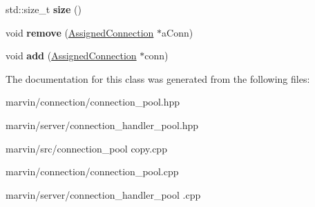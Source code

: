 \begin{DoxyCompactItemize}
\mbox{\label{class_in_use_connections_type_a0dc7ed043e59287fac24b3828dcd5ec6}} 
std\+::size\+\_\+t {\bfseries size} ()
\item 
\mbox{\label{class_in_use_connections_type_a3a12406ec1666fe7d0c53391b2cba2b3}} 
void {\bfseries remove} (\hyperlink{class_assigned_connection}{Assigned\+Connection} $\ast$a\+Conn)
\item 
\mbox{\label{class_in_use_connections_type_a36211f9768a4d78a1cd1f9fa4d861420}} 
void {\bfseries add} (\hyperlink{class_assigned_connection}{Assigned\+Connection} $\ast$conn)
\end{DoxyCompactItemize}


The documentation for this class was generated from the following files\+:\begin{DoxyCompactItemize}
\item 
marvin/connection/connection\+\_\+pool.\+hpp\item 
marvin/server/connection\+\_\+handler\+\_\+pool.\+hpp\item 
marvin/src/connection\+\_\+pool copy.\+cpp\item 
marvin/connection/connection\+\_\+pool.\+cpp\item 
marvin/server/connection\+\_\+handler\+\_\+pool .\+cpp\end{DoxyCompactItemize}
